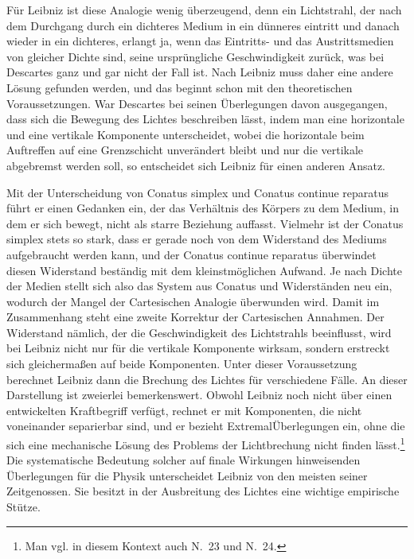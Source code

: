 F\"{u}r Leibniz ist diese Analogie wenig \"{u}berzeugend, denn ein Lichtstrahl, der nach dem Durchgang durch ein dichteres Medium in ein d\"{u}nneres eintritt und danach wieder in ein dichteres, erlangt ja, wenn das Eintritts- und das Austritts\-medien von gleicher Dichte sind, seine urspr\"{u}ngliche Geschwindigkeit zur\"{u}ck, was bei Descartes ganz und gar nicht der Fall ist. Nach Leibniz muss daher eine andere L\"{o}sung gefunden werden, und das beginnt schon mit den theoretischen Voraus\-setzungen. War Descartes bei seinen \"{U}berlegungen davon ausgegangen, dass sich die Bewegung des Lichtes beschreiben l\"{a}sst, indem man eine horizontale und eine vertikale Komponente unterscheidet, wobei die horizontale beim Auftreffen auf eine Grenzschicht unver\"{a}ndert bleibt und nur die vertikale abgebremst werden soll, so entscheidet sich Leibniz f\"{u}r einen anderen Ansatz.\par
Mit der Unterscheidung von Conatus simplex und Conatus continue reparatus f\"{u}hrt er einen Gedanken ein, der das Verh\"{a}ltnis des K\"{o}rpers zu dem Medium, in dem er sich bewegt, nicht als starre Beziehung auffasst. Vielmehr ist der Conatus simplex stets so stark, dass er gerade noch von dem Widerstand des Medi\-ums aufgebraucht werden kann, und der Conatus continue reparatus \"{u}berwindet diesen Widerstand best\"{a}ndig mit dem kleinstm\"{o}glichen Aufwand. Je nach Dichte der Medien stellt sich also das System aus Conatus und Widerst\"{a}nden neu ein, wodurch der Mangel der Cartesischen Analogie \"{u}berwunden wird. Damit im Zusammenhang steht eine zweite Korrektur der Cartesischen Annahmen. Der Widerstand n\"{a}mlich, der die Geschwindigkeit des Lichtstrahls beeinflusst, wird bei Leibniz nicht nur f\"{u}r die vertikale Komponente wirksam, sondern erstreckt sich gleicherma{\ss}en auf beide Komponenten. Unter dieser Voraussetzung be\-rechnet Leibniz dann die Brechung des Lichtes f\"{u}r verschiedene F\"{a}lle. 
An dieser Darstellung ist zweierlei bemerkenswert. Obwohl Leibniz noch nicht \"{u}ber einen entwickelten Kraftbegriff verf\"{u}gt, rechnet er mit Komponenten, die nicht vonein\-ander separierbar sind, und er bezieht Extremal\"{U}berlegungen ein, ohne die sich eine mechanische L\"{o}sung des Problems der Lichtbrechung nicht finden l\"{a}sst.\footnote{\footnotesize Man vgl. in diesem Kontext auch N.~23 und N.~24.} Die systematische Bedeutung solcher auf finale Wirkungen hinweisenden \"{U}berlegungen f\"{u}r die Physik unterscheidet Leibniz von den meisten seiner Zeitgenossen. Sie besitzt in der Ausbreitung des Lichtes eine wichtige empirische St\"{u}tze.\par
